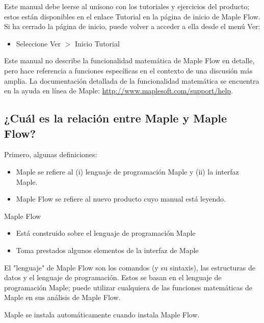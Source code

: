 Este manual debe leerse al unísono con los tutoriales y ejercicios del producto; estos están disponibles en el enlace Tutorial en la página de inicio de Maple Flow. Si ha cerrado la página de inicio, puede volver a acceder a ella desde el menú Ver:

\begin{itemize}
  \item Seleccione Ver $>$ Inicio Tutorial		
\end{itemize}


Este manual no describe la funcionalidad matemática de Maple Flow en detalle, pero hace referencia a funciones específicas en el contexto de una discusión más amplia. La documentación detallada de la funcionalidad matemática se encuentra en la ayuda en línea de Maple: \href{http://www.maplesoft.com/support/help}{http://www.maplesoft.com/support/help}.

\subsection{¿Cuál es la relación entre Maple y Maple Flow?}
Primero, algunas definiciones:

\begin{itemize}
	\item Maple se refiere al (i) lenguaje de programación Maple y (ii) la interfaz Maple.

	\item Maple Flow se refiere al nuevo producto cuyo manual está leyendo.
\end{itemize}

Maple Flow

\begin{itemize}
  \item Está construido sobre el lenguaje de programación Maple
  
  \item Toma prestados algunos elementos de la interfaz de Maple
\end{itemize}

El "lenguaje" de Maple Flow son los comandos (y su sintaxis), las estructuras de datos y el lenguaje de programación. Estos se basan en el lenguaje de programación Maple; puede utilizar cualquiera de las funciones matemáticas de Maple en sus análisis de Maple Flow.

Maple se instala automáticamente cuando instala Maple Flow.

